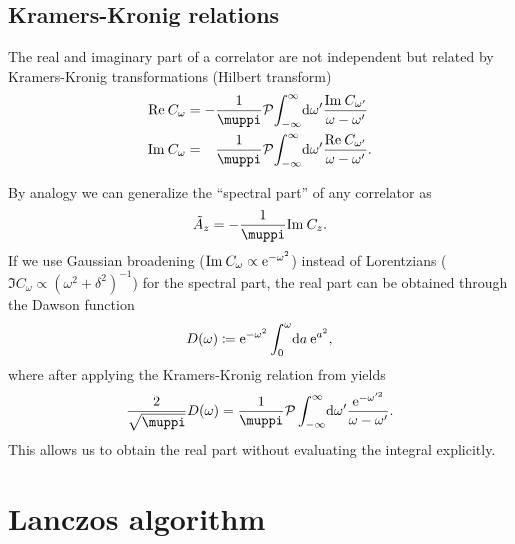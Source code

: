 \subsection{Kramers-Kronig relations}

The real and imaginary part of a correlator are not independent
but related by Kramers-Kronig transformations (Hilbert transform)
\begin{subequations}
    \begin{align}
        \Re C_\omega
         & =
        - \frac{1}{\muppi} \mathcal{P}\! \int_{-\infty}^\infty\! \md\omega'
        \frac{\Im C_{\omega'}}{\omega - \omega'} \\
        \Im C_\omega
         & =
        \phantom{-} \frac{1}{\muppi} \mathcal{P}\! \int_{-\infty}^\infty\! \md\omega'
        \frac{\Re C_{\omega'}}{\omega - \omega'}.
        \label{eq:Kramers-Kronig-relation}
    \end{align}
\end{subequations}

By analogy we can generalize the ``spectral part'' of any correlator as
\begin{equation}
    \tilde A_z = -\frac{1}{\muppi}\Im C_z.
\end{equation}
If we use Gaussian broadening ($\mathrm{Im}\> C_\omega \propto \mathrm{e}^{-\omega^2}$) instead of
Lorentzians ($\Im C_\omega \propto (\omega^2 + \delta^2)^{-1}$)
for the spectral part,
the real part can be obtained through the Dawson function
\begin{equation}
    D(\omega)
    \coloneqq
    \mathrm{e}^{-\omega^2}\int_0^\omega\! \mathrm{d} a\> \mathrm{e}^{a^2},
\end{equation}
where after applying the Kramers-Kronig relation
from  yields
\begin{equation}
    \frac{2}{\sqrt{\muppi}}D(\omega)
    =
    \frac{1}{\muppi} \mathcal{P} \int_{-\infty}^\infty\! \md\omega'
    \frac{\me^{-\omega'^2}}{\omega - \omega'}.
\end{equation}
This allows us to obtain the real part without evaluating the integral explicitly.


\section{Lanczos algorithm}

